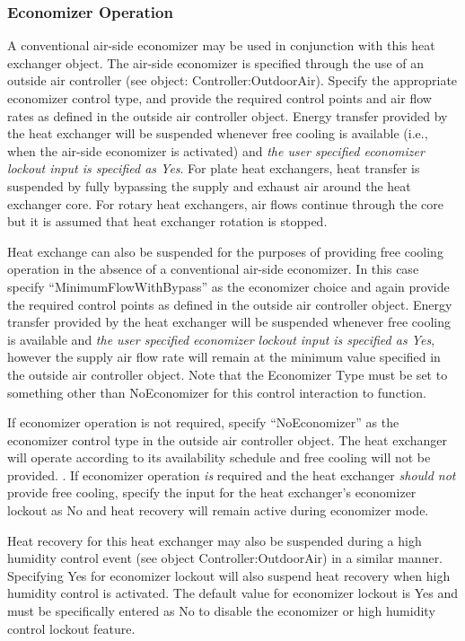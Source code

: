 \subsubsection{Economizer Operation}\label{economizer-operation}

A conventional air-side economizer may be used in conjunction with this heat exchanger object. The air-side economizer is specified through the use of an outside air controller (see object: Controller:OutdoorAir). Specify the appropriate economizer control type, and provide the required control points and air flow rates as defined in the outside air controller object. Energy transfer provided by the heat exchanger will be suspended whenever free cooling is available (i.e., when the air-side economizer is activated) and \emph{the user specified economizer lockout input is specified as Yes}. For plate heat exchangers, heat transfer is suspended by fully bypassing the supply and exhaust air around the heat exchanger core. For rotary heat exchangers, air flows continue through the core but it is assumed that heat exchanger rotation is stopped.

Heat exchange can also be suspended for the purposes of providing free cooling operation in the absence of a conventional air-side economizer. In this case specify ``MinimumFlowWithBypass'' as the economizer choice and again provide the required control points as defined in the outside air controller object. Energy transfer provided by the heat exchanger will be suspended whenever free cooling is available and \emph{the user specified economizer lockout input is specified as Yes}, however the supply air flow rate will remain at the minimum value specified in the outside air controller object. Note that the Economizer Type must be set to something other than NoEconomizer for this control interaction to function.

If economizer operation is not required, specify ``NoEconomizer'' as the economizer control type in the outside air controller object. The heat exchanger will operate according to its availability schedule and free cooling will not be provided. . If economizer operation \emph{is} required and the heat exchanger \emph{should not} provide free cooling, specify the input for the heat exchanger's economizer lockout as No and heat recovery will remain active during economizer mode.

Heat recovery for this heat exchanger may also be suspended during a high humidity control event (see object Controller:OutdoorAir) in a similar manner. Specifying Yes for economizer lockout will also suspend heat recovery when high humidity control is activated. The default value for economizer lockout is Yes and must be specifically entered as No to disable the economizer or high humidity control lockout feature.

